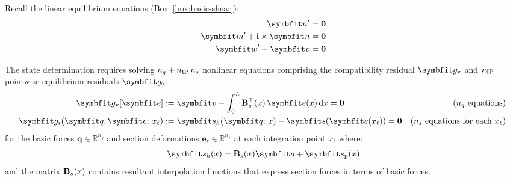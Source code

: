 
Recall the linear equilibrium equations (Box~\ref{box:basic-shear}):
\begin{equation}
    \begin{aligned}
        \bm{n}' &=  \mathbf{0} \\
        \bm{m}' + \FrameBasis \times \bm{n} &= \mathbf{0} \\
        \bm{w}' - \bm{v} &= \mathbf{0}
    \end{aligned}
\end{equation}

The state determination requires solving \(n_q+n_{\rm IP}\,n_s\) nonlinear equations comprising the compatibility residual \(\residv\) and \(n_{\rm IP}\) pointwise equilibrium residuals \(\resids\):
\begin{subequations}
\begin{align}
\residv[\bm{e}] &:= \bm{v}-\int_0^L \ForceInterp^{\top}(x)\,\bm{e}(x)\,\dd\reflenx = \mathbf{0}
&\text{(\(n_q\) equations) }
\label{eq:def-mf-gv}
\\
\resids(\bm{q},\bm{e};\,x_{\ell}) &:= \inters(\bm{q};\,x)-\bm{s}(\bm{e}(x_{\ell}))=\mathbf{0}
&\text{(\(n_s\) equations for each \(x_{\ell}\)) }
\label{eq:def-mf-gs}
\end{align}
\label{eq:def-mf-residual}
\end{subequations}
for the basic forces \(\bm{q}\in\mathbb{R}^{n_q}\) and section deformations \(\bm{e}_{\ell}\in\mathbb{R}^{n_s}\) at each integration point \(x_{\ell}\)
where:
\begin{equation}
\inters(x) = \ForceInterp(x) \bm{q} + \bm{s}_{\mathrm{p}}(x)
\label{eq:def-interps}
\end{equation}
and the matrix $\mathbf{B}_{s}(x)$ contains resultant interpolation functions that express section forces in terms of basic forces. 

